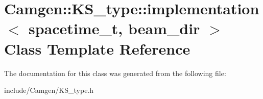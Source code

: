 \hypertarget{a00293}{}\section{Camgen\+:\+:K\+S\+\_\+type\+:\+:implementation$<$ spacetime\+\_\+t, beam\+\_\+dir $>$ Class Template Reference}
\label{a00293}


The documentation for this class was generated from the following file\+:\begin{DoxyCompactItemize}
\item 
include/\+Camgen/K\+S\+\_\+type.\+h\end{DoxyCompactItemize}
